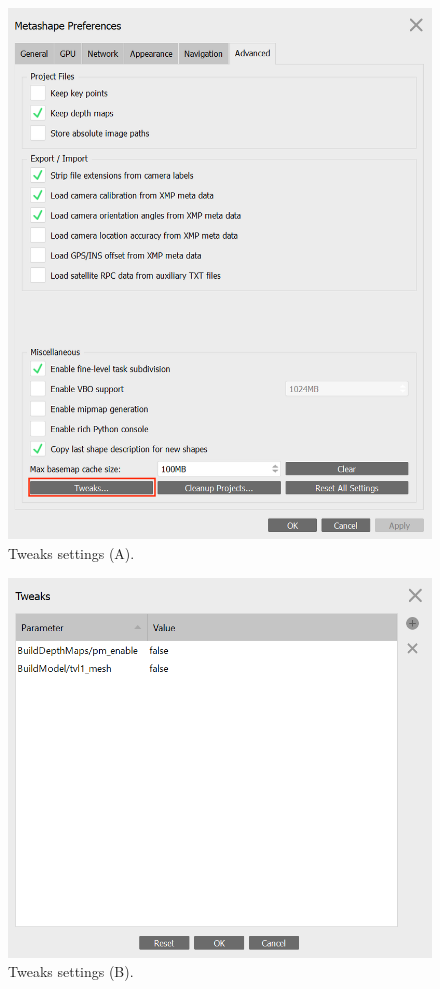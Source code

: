 \documentclass[
]{book}
\begin{document}
\begin{figure}

{\centering \includegraphics[width=0.8\linewidth]{Figures/Metashape_tweaks_1} 

}

\caption{Tweaks settings (A).}\label{fig:metashapetweaks1}
\end{figure}

\begin{figure}

{\centering \includegraphics[width=0.8\linewidth]{Figures/Metashape_tweaks_2} 

}

\caption{Tweaks settings (B).}\label{fig:metashapetweaks2}
\end{figure}
\end{document}
